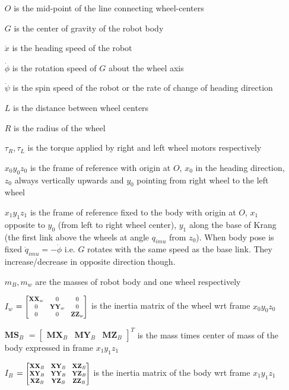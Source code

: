 \documentclass[a4paper,10pt]{article}
\newcommand\scalemath[2]{\scalebox{#1}{\mbox{\ensuremath{\displaystyle #2}}}}
\begin{document}
\begin{itemize}[label={}]
 \item[$O$] is the mid-point of the line connecting wheel-centers
 \item[$G$] is the center of gravity of the robot body
 \item[$\dot{x}$] is the heading speed of the robot
 \item[$\dot{\phi}$] is the rotation speed of $G$ about the wheel axis
 \item[$\dot{\psi}$] is the spin speed of the robot or the rate of change of heading direction
 \item[$L$] is the distance between wheel centers
 \item[$R$] is the radius of the wheel
 \item[$\tau_R, \tau_L$] is the torque applied by right and left wheel motors respectively 
 \item[$x_0y_0z_0$] is the frame of reference with origin at $O$, $x_0$ in the heading direction,
 $z_0$ always vertically upwards and $y_0$ pointing from right wheel to the left wheel
 \item[$x_1y_1z_1$] is the frame of reference fixed to the body with origin at $O$, $x_1$ opposite 
 to $y_0$ (from left to right wheel center), $y_1$ along the base of Krang (the first link above the wheels at angle $q_{imu}$ from
 $z_0$). When body pose is fixed $\dot{q}_{imu} = -\dot\phi$ i.e. $G$ rotates with the same speed as the base link. They increase/decrease
 in opposite direction though.
 \item[$m_B, m_w$] are the masses of robot body and one wheel respectively
 \item[$I_w$] $= \scalemath{0.75}{\left[\begin{matrix} \mathbf{XX}_w & 0 & 0 \\  
 0 & \mathbf{YY}_w & 0 \\ 
 0 & 0 & \mathbf{ZZ}_w \end{matrix}\right]}$
 \normalsize is the inertia matrix of the wheel wrt frame $x_0y_0z_0$
 \item[$\mathbf{MS}_B$] $=\left[\begin{matrix}\mathbf{MX}_B & \mathbf{MY}_B & \mathbf{MZ}_B\end{matrix}\right]^T$ is the mass times center of mass of the body expressed in frame $x_1y_1z_1$
 \item[$I_B$] $= \scalemath{0.75}{\left[\begin{matrix} \mathbf{XX}_B & \mathbf{XY}_B & \mathbf{XZ}_B \\
  \mathbf{XY}_B & \mathbf{YY}_B & \mathbf{YZ}_B \\ 
  \mathbf{XZ}_B & \mathbf{YZ}_B & \mathbf{ZZ}_B \end{matrix}\right]}$
  is the inertia matrix of the body wrt frame $x_1y_1z_1$ 
\end{itemize}
\end{document}
